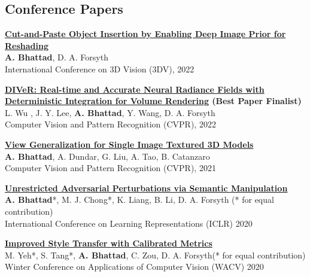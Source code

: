 \documentclass[margin,line]{res}
\begin{document}
\begin{resume}
\section{\sc \large Conference Papers}
\renewcommand*{\labelenumi}{\theenumi.}
\begin{etaremune}[start=5, leftmargin=15pt]
\item {\bf \href{https://anandbhattad.github.io/projects/dipr.pdf}{Cut-and-Paste Object Insertion by Enabling Deep Image Prior for Reshading }} \\{{\bf A. Bhattad}, D. A. Forsyth}
 \\{International Conference on 3D Vision (3DV), 2022}
\item {\bf \href{https://arxiv.org/abs/2111.10427}{DIVeR: Real-time and Accurate Neural Radiance Fields with Deterministic Integration for Volume Rendering} {\color{red} (Best Paper Finalist)}} \\{ L. Wu ,   J. Y. Lee,   {\bf A. Bhattad},    Y. Wang,    D. A. Forsyth}
 \\{Computer Vision and Pattern Recognition (CVPR), 2022}
\item {\bf \href{https://arxiv.org/abs/2106.06533}{View Generalization for Single Image Textured 3D Models}} \\{{\bf A. Bhattad}, A. Dundar, G. Liu, A. Tao, B. Catanzaro \\{Computer Vision and Pattern Recognition (CVPR), 2021}}
\item {\bf \href{https://openreview.net/forum?id=Sye_OgHFwH}{Unrestricted Adversarial Perturbations via Semantic Manipulation}} \\{{\bf A. Bhattad}*, M. J. Chong*, K. Liang, B. Li, D. A. Forsyth \hfill{(* for equal contribution)}}\\{International Conference on Learning Representations (ICLR) 2020} 
\item {\bf \href{https://arxiv.org/abs/1910.09447}{Improved Style Transfer with Calibrated Metrics}}\\
{M. Yeh*, S. Tang*, {\bf A. Bhattad}, C. Zou, D. A. Forsyth\hfill{(* for equal contribution)}} \\
{Winter Conference on Applications of Computer Vision ({WACV}) 2020}
\end{etaremune}

\end{resume}
\end{document}
